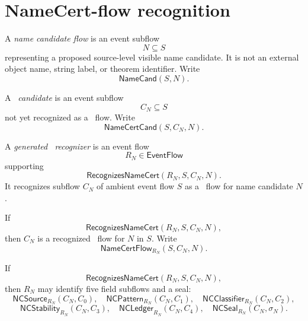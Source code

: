 \section{NameCert-flow recognition}
\label{sec:pkg-namecert-namecert-recognition}

\begin{definition}
\label{def:pkg-namecert-name-candidate}
A \emph{name candidate flow} is an event subflow
$$
  N\subseteq S
$$
representing a proposed source-level visible name candidate. It is not an external object name, string label, or theorem identifier. Write
$$
  \mathsf{NameCand}(S,N).
$$
\end{definition}

\begin{definition}
\label{def:pkg-namecert-namecert-candidate}
A \emph{\NameCert\ candidate} is an event subflow
$$
  C_N\subseteq S
$$
not yet recognized as a \NameCert\ flow. Write
$$
  \mathsf{NameCertCand}(S,C_N,N).
$$
\end{definition}

\begin{definition}
\label{def:pkg-namecert-generated-namecert-recognizer}
A \emph{generated \NameCert\ recognizer} is an event flow
$$
  R_N\in\mathsf{EventFlow}
$$
supporting
$$
  \mathsf{RecognizesNameCert}(R_N,S,C_N,N).
$$
It recognizes subflow $C_N$ of ambient event flow $S$ as a \NameCert\ flow for name candidate $N$.
\end{definition}

\begin{definition}
\label{def:pkg-namecert-recognized-namecert-flow}
If
$$
  \mathsf{RecognizesNameCert}(R_N,S,C_N,N),
$$
then $C_N$ is a recognized \NameCert\ flow for $N$ in $S$. Write
$$
  \mathsf{NameCertFlow}_{R_N}(S,C_N,N).
$$
\end{definition}

\begin{definition}
\label{def:pkg-namecert-field-subflows}
If
$$
  \mathsf{RecognizesNameCert}(R_N,S,C_N,N),
$$
then $R_N$ may identify five field subflows and a seal:
$$
  \mathsf{NCSource}_{R_N}(C_N,C_0),
  \quad
  \mathsf{NCPattern}_{R_N}(C_N,C_1),
  \quad
  \mathsf{NCClassifier}_{R_N}(C_N,C_2),
$$
$$
  \mathsf{NCStability}_{R_N}(C_N,C_3),
  \quad
  \mathsf{NCLedger}_{R_N}(C_N,C_4),
  \quad
  \mathsf{NCSeal}_{R_N}(C_N,\sigma_N).
$$
\end{definition}

